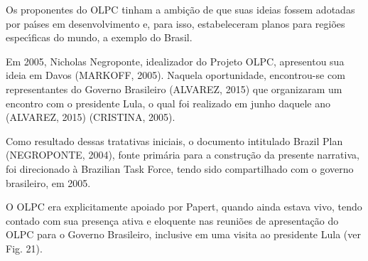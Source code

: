 \documentclass[
12pt,		%
openright,	%
twoside,  %
a4paper,			%
chapter=TITLE,		%
english,			%
french,				%
spanish,			%
brazil				%
]{USPSC-classe/USPSC}
\begin{document}
Os proponentes do OLPC tinham a ambi\c{c}\~ao de que suas ideias fossem adotadas por pa\'{\i}ses em desenvolvimento e, para isso, estabeleceram planos para regi\~oes espec\'{\i}ficas do mundo, a exemplo do Brasil.

















Em 2005, Nicholas Negroponte, idealizador do Projeto OLPC, apresentou sua ideia em Davos (MARKOFF, 2005). Naquela oportunidade, encontrou-se com representantes do Governo Brasileiro (ALVAREZ, 2015) que organizaram um encontro com o presidente Lula, o qual foi realizado em junho daquele ano (ALVAREZ, 2015) (CRISTINA, 2005).

















Como resultado dessas tratativas iniciais, o documento intitulado \textquotedbl Brazil Plan \textquotedbl  (NEGROPONTE, 2004), fonte prim\'aria para a constru\c{c}\~ao da presente narrativa, foi direcionado \`a \textquotedbl Brazilian Task Force\textquotedbl , tendo sido compartilhado com o governo brasileiro, em 2005.

















O OLPC era explicitamente apoiado por Papert, quando ainda estava vivo, tendo contado com sua presen\c{c}a ativa e eloquente nas reuni\~oes de apresenta\c{c}\~ao do OLPC para o Governo Brasileiro, inclusive em uma visita ao presidente Lula (ver Fig. 21).
\end{document}
